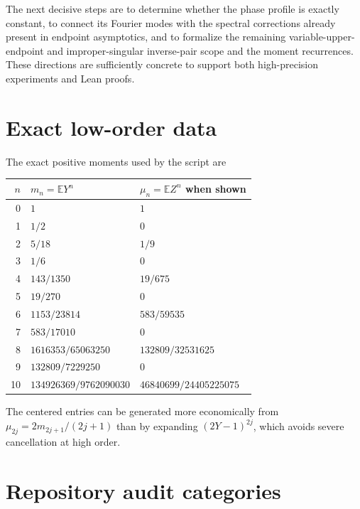\documentclass[11pt,oneside]{article}
\theoremstyle{definition}
\theoremstyle{remark}
\newcommand{\E}{\mathbb E}
\newcommand{\1}{\mathbf 1}
\begin{document}
The next decisive steps are to determine whether the phase profile is exactly constant,
to connect its Fourier modes with the spectral corrections already present in endpoint
asymptotics, and to formalize the remaining variable-upper-endpoint and improper-singular
inverse-pair scope and the moment recurrences.  These directions
are sufficiently concrete to support both high-precision experiments and Lean proofs.

\appendix

\section{Exact low-order data}

The exact positive moments used by the script are
\begin{longtable}{@{}rll@{}}
\toprule
\(n\)&\(m_n=\E Y^n\)&\(\mu_n=\E Z^n\) when shown\\
\midrule
0&\(1\)&\(1\)\\
1&\(1/2\)&\(0\)\\
2&\(5/18\)&\(1/9\)\\
3&\(1/6\)&\(0\)\\
4&\(143/1350\)&\(19/675\)\\
5&\(19/270\)&\(0\)\\
6&\(1153/23814\)&\(583/59535\)\\
7&\(583/17010\)&\(0\)\\
8&\(1616353/65063250\)&\(132809/32531625\)\\
9&\(132809/7229250\)&\(0\)\\
10&\(134926369/9762090030\)&\(46840699/24405225075\)\\
\bottomrule
\end{longtable}
The centered entries can be generated more economically from
\(\mu_{2j}=2m_{2j+1}/(2j+1)\) than by expanding \((2Y-1)^{2j}\), which avoids severe
cancellation at high order.

\section{Repository audit categories}
\end{document}
